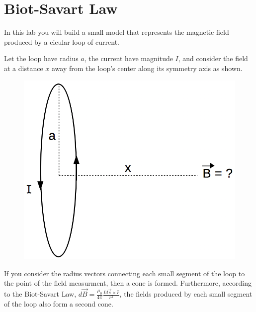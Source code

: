 \section{Biot-Savart Law}

In this lab you will build a small model that represents the magnetic field produced by a cicular loop of current.

\vspace{\baselineskip}

Let the loop have radius $a$, the current have magnitude $I$, and consider the field at a distance $x$ away from the loop's center along its symmetry axis as shown.

\begin{figure}[H]
\includegraphics[scale=0.40]{figures/biot-savart/current-loop.png}
\end{figure}

If you consider the radius vectors connecting each small segment of the loop to the point of the field measurment, then a cone is formed.
Furthermore, according to the Biot-Savart Law, $d \vec{B} = \frac{\mu_0}{4 \pi} \frac{I d \vec{s} \times \hat{r}}{r^2}$, the fields produced by each small segment of the loop also form a second cone.

